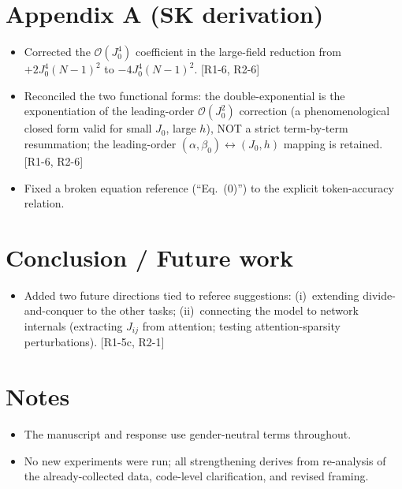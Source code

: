 \documentclass[11pt]{article}
\newcommand{\rf}[1]{\hfill\textnormal{\small[#1]}}
\begin{document}
\section{Appendix A (SK derivation)}
\begin{itemize}
  \item Corrected the $\mathcal{O}(J_0^4)$ coefficient in the large-field reduction from
        $+2J_0^4(N-1)^2$ to $-4J_0^4(N-1)^2$. \rf{R1-6, R2-6}
  \item Reconciled the two functional forms: the double-exponential is the exponentiation of the
        leading-order $\mathcal{O}(J_0^2)$ correction (a phenomenological closed form valid for
        small $J_0$, large $h$), NOT a strict term-by-term resummation; the leading-order
        $(\alpha,\beta_0)\leftrightarrow(J_0,h)$ mapping is retained. \rf{R1-6, R2-6}
  \item Fixed a broken equation reference (``Eq.~(0)'') to the explicit token-accuracy relation.
\end{itemize}

\section{Conclusion / Future work}
\begin{itemize}
  \item Added two future directions tied to referee suggestions: (i)~extending divide-and-conquer
        to the other tasks; (ii)~connecting the model to network internals (extracting $J_{ij}$
        from attention; testing attention-sparsity perturbations). \rf{R1-5c, R2-1}
\end{itemize}

\section{Notes}
\begin{itemize}
  \item The manuscript and response use gender-neutral terms throughout.
  \item No new experiments were run; all strengthening derives from re-analysis of the
        already-collected data, code-level clarification, and revised framing.
\end{itemize}
\end{document}
